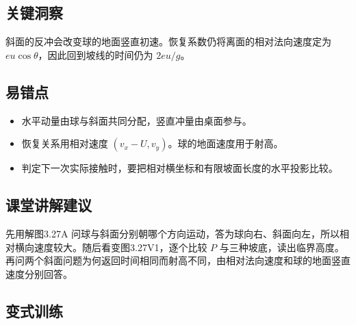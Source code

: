 \documentclass[UTF8,fontset=fandol,a4paper,11pt]{ctexart}
\begin{document}


\subsection*{关键洞察}

斜面的反冲会改变球的地面竖直初速。恢复系数仍将离面的相对法向速度定为 $eu\cos\theta$，因此回到坡线的时间仍为 $2eu/g$。



\subsection*{易错点}

\begin{itemize}
\item 水平动量由球与斜面共同分配，竖直冲量由桌面参与。
\item 恢复关系用相对速度 $(v_x-U,v_y)$。球的地面速度用于射高。
\item 判定下一次实际接触时，要把相对横坐标和有限坡面长度的水平投影比较。
\end{itemize}



\subsection*{课堂讲解建议}

先用解图3.27A 问球与斜面分别朝哪个方向运动，答为球向右、斜面向左，所以相对横向速度较大。随后看变图3.27V1，逐个比较 $P$ 与三种坡底，读出临界高度。再问两个斜面问题为何返回时间相同而射高不同，由相对法向速度和球的地面竖直速度分别回答。



\subsection*{变式训练}
\end{document}
